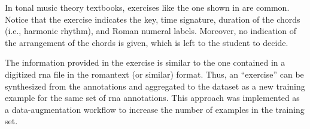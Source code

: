 
In tonal music theory textbooks, exercises like the one
shown in  are common. Notice that
the exercise indicates the key, time signature, duration of
the chords (i.e., harmonic rhythm), and Roman numeral
labels. Moreover, no indication of the arrangement of the
chords is given, which is left to the student to decide. 


The information provided in the exercise is similar to the
one contained in a digitized \gls{rna} file in the
\gls{romantext} (or similar) format. Thus, an ``exercise''
can be synthesized from the annotations and aggregated to
the dataset as a new training example for the same set of
\gls{rna} annotations. This approach was implemented as a
data-augmentation workflow to increase the number of
examples in the training set.
